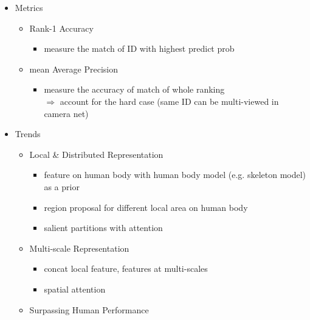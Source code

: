 \begin{itemize}
\begin{itemize}
\begin{itemize}
		\end{itemize}
	\end{itemize}
\item Metrics
	\begin{itemize}
	\item Rank-1 Accuracy
		\begin{itemize}
		\item measure the match of ID with highest predict prob
		\end{itemize}
	\item mean Average Precision
		\begin{itemize}
		\item measure the accuracy of match of whole ranking \\
		$\Rightarrow$ account for the hard case (same ID can be multi-viewed in camera net)
		\end{itemize}
	\end{itemize}
\item Trends
	\begin{itemize}
	\item Local \& Distributed Representation
		\begin{itemize}
		\item feature on human body with human body model (e.g. skeleton model) as a prior
		\item region proposal for different local area on human body
		\item salient partitions with attention
		\end{itemize}
	\item Multi-scale Representation
		\begin{itemize}
		\item concat local feature, features at multi-scales
		\item spatial attention
		\end{itemize}
	\item Surpassing Human Performance
	\end{itemize}
\end{itemize}
